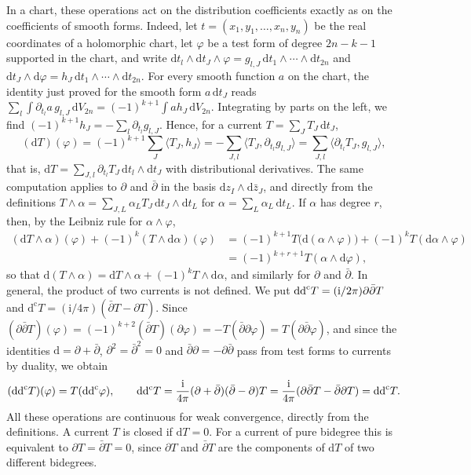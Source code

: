 In a chart, these operations act on the distribution coefficients exactly as on the coefficients of smooth forms. Indeed, let $t=(x_1,y_1,\ldots,x_n,y_n)$ be the real coordinates of a holomorphic chart, let $\varphi$ be a test form of degree $2n-k-1$ supported in the chart, and write $\mathrm dt_l\wedge\mathrm dt_J\wedge\varphi=g_{l,J}\,\mathrm dt_1\wedge\cdots\wedge\mathrm dt_{2n}$ and $\mathrm dt_J\wedge\mathrm d\varphi=h_J\,\mathrm dt_1\wedge\cdots\wedge\mathrm dt_{2n}$. For every smooth function $a$ on the chart, the identity just proved for the smooth form $a\,\mathrm dt_J$ reads $\sum_l\int\partial_{t_l}a\,g_{l,J}\,\mathrm dV_{2n}=(-1)^{k+1}\int ah_J\,\mathrm dV_{2n}$. Integrating by parts on the left, we find $(-1)^{k+1}h_J=-\sum_l\partial_{t_l}g_{l,J}$. Hence, for a current $T=\sum_JT_J\,\mathrm dt_J$,
\[
 (\mathrm dT)(\varphi)=(-1)^{k+1}\sum_J\langle T_J,h_J\rangle=-\sum_{J,l}\langle T_J,\partial_{t_l}g_{l,J}\rangle=\sum_{J,l}\langle\partial_{t_l}T_J,g_{l,J}\rangle,
\]
that is, $\mathrm dT=\sum_{J,l}\partial_{t_l}T_J\,\mathrm dt_l\wedge\mathrm dt_J$ with distributional derivatives. The same computation applies to $\partial$ and $\bar\partial$ in the basis $\mathrm dz_I\wedge\mathrm d\bar z_J$, and directly from the definitions $T\wedge\alpha=\sum_{J,L}\alpha_LT_J\,\mathrm dt_J\wedge\mathrm dt_L$ for $\alpha=\sum_L\alpha_L\,\mathrm dt_L$. If $\alpha$ has degree $r$, then, by the Leibniz rule for $\alpha\wedge\varphi$,
\begin{align*}
 (\mathrm dT\wedge\alpha)(\varphi)+(-1)^k(T\wedge\mathrm d\alpha)(\varphi)&=(-1)^{k+1}T\big(\mathrm d(\alpha\wedge\varphi)\big)+(-1)^kT(\mathrm d\alpha\wedge\varphi)\\
 &=(-1)^{k+r+1}T(\alpha\wedge\mathrm d\varphi),
\end{align*}
so that $\mathrm d(T\wedge\alpha)=\mathrm dT\wedge\alpha+(-1)^kT\wedge\mathrm d\alpha$, and similarly for $\partial$ and $\bar\partial$. In general, the product of two currents is not defined. We put $\mathrm{dd}^{\mathrm{c}} T=(\mathrm{i}/2\pi)\partial\bar\partial T$ and $\mathrm d^{\mathrm c}T=(\mathrm{i}/4\pi)(\bar\partial T-\partial T)$. Since $(\partial\bar\partial T)(\varphi)=(-1)^{k+2}(\bar\partial T)(\partial\varphi)=-T(\bar\partial\partial\varphi)=T(\partial\bar\partial\varphi)$, and since the identities $\mathrm d=\partial+\bar\partial$, $\partial^2=\bar\partial^2=0$ and $\bar\partial\partial=-\partial\bar\partial$ pass from test forms to currents by duality, we obtain
\[
 (\mathrm{dd}^{\mathrm{c}} T)(\varphi)=T(\mathrm{dd}^{\mathrm{c}}\varphi),\qquad \mathrm d\mathrm d^{\mathrm c}T=\frac{\mathrm i}{4\pi}(\partial+\bar\partial)(\bar\partial-\partial)T=\frac{\mathrm i}{4\pi}(\partial\bar\partial T-\bar\partial\partial T)=\mathrm{dd}^{\mathrm{c}} T.
\]
All these operations are continuous for weak convergence, directly from the definitions. A current $T$ is closed if $\mathrm{d}T=0$. For a current of pure bidegree this is equivalent to $\partial T=\bar\partial T=0$, since $\partial T$ and $\bar\partial T$ are the components of $\mathrm dT$ of two different bidegrees.

